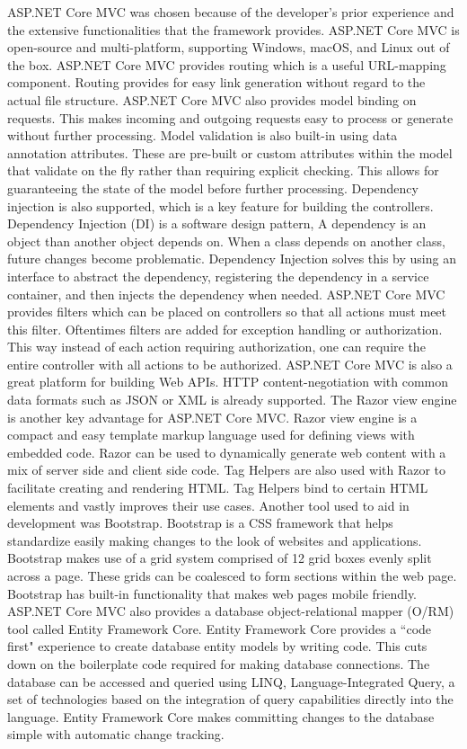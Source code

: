ASP.NET Core MVC was chosen because of the developer's prior experience and the extensive functionalities that the framework provides. ASP.NET Core MVC is open-source and multi-platform, supporting Windows, macOS, and Linux out of the box. ASP.NET Core MVC provides routing which is a useful URL-mapping component. Routing provides for easy link generation without regard to the actual file structure. ASP.NET Core MVC also provides model   binding on requests. This makes incoming and outgoing requests easy to process or generate without further processing. Model validation is also built-in using data annotation attributes. These are pre-built or custom attributes within the model that validate on the fly rather than requiring explicit checking. This allows for guaranteeing the state of the model before further processing. Dependency injection is also supported, which is a key feature for building the controllers. Dependency Injection (DI) is a software design pattern,  A dependency is an object than another object depends on. When a class depends on another class, future changes become problematic. Dependency Injection solves this by using an interface to abstract the dependency, registering the dependency in a service container, and then injects the dependency when needed. ASP.NET Core MVC provides filters which can be placed on controllers so that all actions must meet this filter. Oftentimes filters are added for exception handling or authorization. This way instead of each action requiring authorization, one can require the entire controller with all actions to be authorized. ASP.NET Core MVC is also a great platform for building Web APIs. HTTP content-negotiation with common data formats such as JSON or XML is already supported. The Razor view engine is another key advantage for ASP.NET Core MVC. Razor view engine is a compact and easy template markup language used for defining views with embedded \C code. Razor can be used to dynamically generate web content with a mix of server side and client side code. Tag Helpers are also used with Razor to facilitate creating and rendering HTML. Tag Helpers bind to certain HTML elements and vastly improves their use cases. Another tool used to aid in development was Bootstrap. Bootstrap is a CSS framework that helps standardize easily making changes to the look of websites and applications. Bootstrap makes use of a grid system comprised of 12 grid boxes evenly split across a page. These grids can be coalesced to form sections within the web page. Bootstrap has built-in functionality that makes web pages mobile friendly. ASP.NET Core MVC also provides a database object-relational mapper (O/RM) tool called Entity Framework Core. Entity Framework Core provides a ``code first" experience to create database entity models by writing code. This cuts down on the boilerplate code required for making database connections. The database can be accessed and queried using LINQ, Language-Integrated Query, a set of technologies based on the integration of query capabilities directly into the \C language. Entity Framework Core makes committing changes to the database simple with automatic change tracking.

